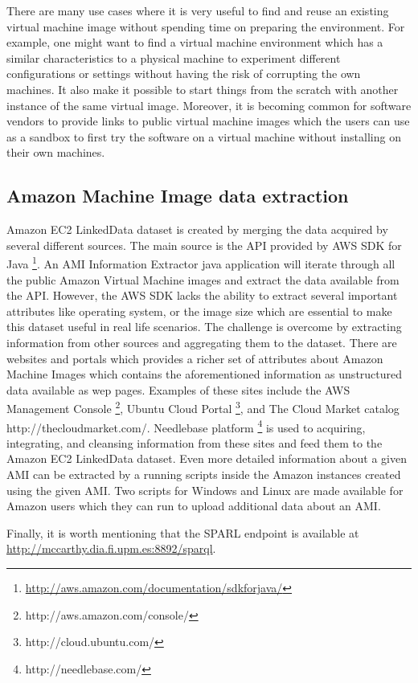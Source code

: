 There are many use cases where it is very useful to find and reuse an existing virtual machine image without spending time on preparing the environment. For example, one might want to find a virtual machine environment which has a similar characteristics to a physical machine to experiment different configurations or settings without having the risk of corrupting the own machines. It also make it possible to start things from the scratch with another instance of the same virtual image. Moreover, it is becoming common for software vendors to provide links to public virtual machine images which the users can use as a sandbox to first try the software on a virtual machine without installing on their own machines.    

\subsection{Amazon Machine Image data extraction}\label{sec:dataex}
Amazon EC2 LinkedData dataset is created by merging the data acquired by several different sources. The main source is the API provided by AWS SDK for Java \footnote{\url{http://aws.amazon.com/documentation/sdkforjava/}}. An AMI Information Extractor java application will iterate through all the public Amazon Virtual Machine images and extract the data available from the API. However, the AWS SDK lacks the ability to extract several important attributes like operating system, or the image size which are essential to make this dataset useful in real life scenarios. The challenge is overcome by extracting information from other sources and aggregating them to the dataset. There are websites and portals which provides a richer set of attributes about Amazon Machine Images which contains the aforementioned information as unstructured data available as wep pages. Examples of these sites include the AWS Management Console \footnote{http://aws.amazon.com/console/}, Ubuntu Cloud Portal \footnote{http://cloud.ubuntu.com/}, and The Cloud Market catalog {http://thecloudmarket.com/}. Needlebase platform \footnote{http://needlebase.com/} is used to acquiring, integrating, and cleansing information from these sites and feed them to the Amazon EC2 LinkedData dataset. Even more detailed information about a given AMI can be extracted by a running scripts inside the Amazon instances created using the given AMI. Two scripts for Windows and Linux are made available for Amazon users which they can run to upload additional data about an AMI.       

Finally, it is worth mentioning that the SPARL endpoint is available at \url{http://mccarthy.dia.fi.upm.es:8892/sparql}.
